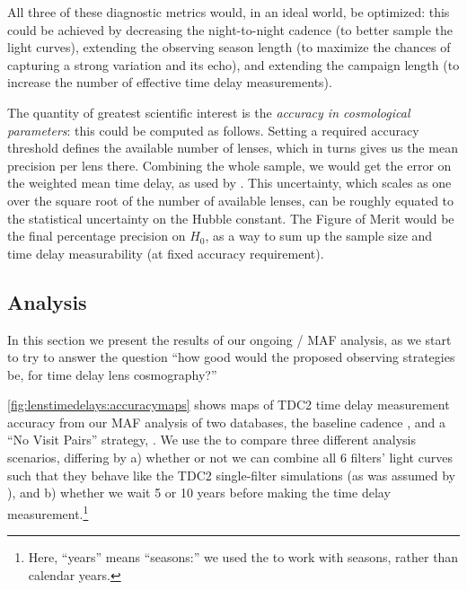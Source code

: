 All three of these diagnostic metrics would, in an ideal world, be
optimized: this could be achieved by decreasing the night-to-night
cadence (to better sample the light curves), extending the observing
season length (to maximize the chances of capturing a strong variation
and its echo), and extending the campaign length (to increase the number
of effective time delay measurements).

The quantity of greatest scientific interest is the {\it accuracy in
cosmological parameters}: this could be computed as follows. Setting a
required accuracy threshold  defines the available number of lenses,
which in turns gives us the mean precision per lens there. Combining the
whole sample, we would get the error on the weighted mean time delay, as
used by \citet{Coe+Moustakas2009}. This uncertainty, which scales as one
over the square root of the number of available lenses,  can be roughly
equated to the statistical uncertainty on the Hubble constant. The
Figure of Merit would be the final percentage precision on $H_0$, as a
way to sum up the sample size and time delay measurability (at fixed
accuracy requirement).


\subsection{\OpSim Analysis}
\label{sec:\secname:analysis}


In this section we present the results of our ongoing \OpSim / MAF
analysis, as we start to try to
answer the question ``how good would the proposed observing
strategies be, for time delay lens cosmography?''

\autoref{fig:lenstimedelays:accuracymaps} shows maps of TDC2 time delay
measurement accuracy from our MAF analysis of two \OpSim databases, the
baseline cadence , and a ``No Visit Pairs''
strategy, . We use the  to compare three different
analysis scenarios, differing by a) whether or not we can combine all 6
filters' light curves such that they behave like the TDC2 single-filter
simulations (as was assumed by \citeauthor{LiaoEtal2015}), and b)
whether we wait 5 or 10 years before making the time delay measurement.\footnote{Here, ``years'' means ``seasons:'' we used the
 to work
with seasons, rather than calendar years.}

